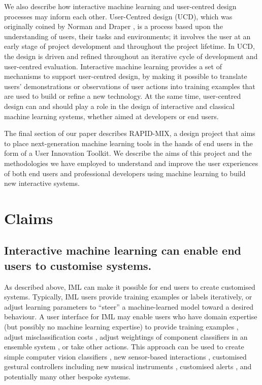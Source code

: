 \documentclass[letterpaper]{article}
\begin{document}
We also describe how interactive machine learning and user-centred design processes may inform each other. User-Centred design (UCD), which was originally coined by Norman and Draper \citeyear{norman1986user}, is a process based upon the understanding of users, their tasks and environments; it involves the user at an early stage of project development and throughout the project lifetime. In UCD, the design is driven and refined throughout an iterative cycle of development and user-centred evaluation. Interactive machine learning provides a set of mechanisms to support user-centred design, by making it possible to translate users' demonstrations or observations of user actions into training examples that are used to build or refine a new technology. At the same time, user-centred design can and should play a role in the design of interactive and classical machine learning systems, whether aimed at developers or end users. 

The final section of our paper describes RAPID-MIX, a design project that aims to place next-generation machine learning tools in the hands of end users in the form of a User Innovation Toolkit. We describe the aims of this project and the methodologies we have employed to understand and improve the user experiences of both end users and professional developers using machine learning to build new interactive systems.

\section{Claims}
\subsection{Interactive machine learning can enable end users to customise systems.} 
As described above, IML can make it possible for end users to create customised systems. Typically, IML users  provide training examples or labels iteratively, or adjust learning parameters to ``steer'' a machine-learned model toward a desired behaviour. A user interface for IML may enable users who have domain expertise (but possibly no machine learning expertise) to provide training examples \cite{fiebrink2011real,fails2003interactive}, adjust misclassification costs \cite{kapoor2010interactive}, adjust weightings of component classifiers in an ensemble system \cite{talbot2009ensemblematrix}, or take other actions. This approach can be used to create simple computer vision classifiers \cite{fails2003interactive}, new sensor-based interactions \cite{hartmann2007authoring}, customised gestural controllers including new musical instruments \cite{fiebrink2011real}, customised alerts \cite{amershi2011cuet}, and potentially many other bespoke systems.
\end{document}

